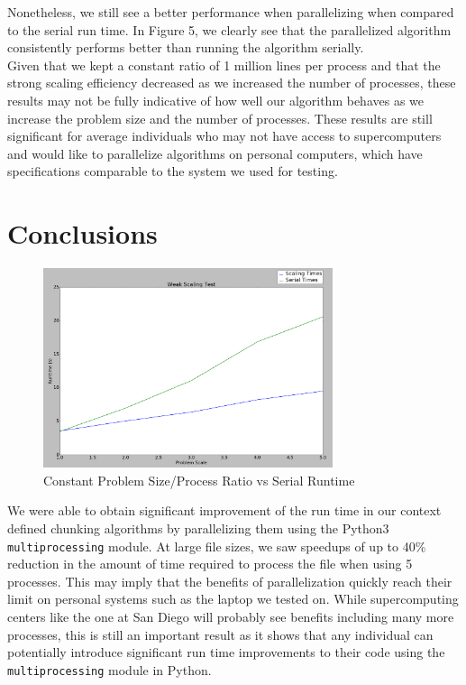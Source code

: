 \documentclass{acmtog} %
\begin{document}
	Nonetheless, we still see a better performance when parallelizing when compared to the serial run time. In Figure 5, we clearly see that the parallelized algorithm consistently performs better than running the algorithm serially. \\
	
	Given that we kept a constant ratio of 1 million lines per process and that the strong scaling efficiency decreased as we increased the number of processes, these results may not be fully indicative of how well our algorithm behaves as we increase the problem size and the number of processes. These results are still significant for average individuals who may not have access to supercomputers and would like to parallelize algorithms on personal computers, which have specifications comparable to the system we used for testing. 
	
	\section{Conclusions}
			\begin{figure}
				\centerline{\includegraphics[width=8.5cm]{img/WeakScaling}}
				\caption{Constant Problem Size/Process Ratio vs Serial Runtime}
				\label{fig:weakscale}
			\end{figure}
	We were able to obtain significant improvement of the run time in our context defined chunking algorithms by parallelizing them using the Python3 \texttt{multiprocessing} module. At large file sizes, we saw speedups of up to 40\% reduction in the amount of time required to process the file when using 5 processes. This may imply that the benefits of parallelization quickly reach their limit on personal systems such as the laptop we tested on. While supercomputing centers like the one at San Diego will probably see benefits including many more processes, this is still an important result as it shows that any individual can potentially introduce significant run time improvements to their code using the \texttt{multiprocessing} module in Python. \\
	
\end{document}
